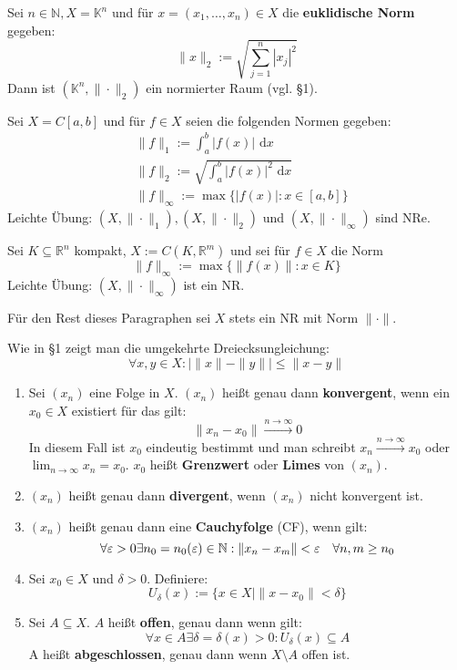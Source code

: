 \documentclass[a4paper,twoside,DIV15,BCOR12mm,chapterprefix=true,headings=twolinechapter]{scrbook}
\begin{document}
\begin{beispiele}
\item Sei $n\in\mathbb{N},X=\mathbb{K}^n$ und für $x=(x_1,\ldots,x_n)\in X$
die \textbf{euklidische Norm} gegeben:
\[\|x\|_2:=\sqrt{\sum_{j=1}^n |x_j|^2}\]
Dann ist $(\mathbb{K}^n,\|\cdot\|_2)$ ein normierter Raum (vgl. §1).
\item Sei $X=C[a,b]$ und für $f\in X$ seien die folgenden Normen gegeben:
\begin{align*}
&\|f\|_1:=\int_a^b|f(x)|\text{ d}x\\
&\|f\|_2:=\sqrt{\int_a^b|f(x)|^2\text{ d}x}\\
&\|f\|_\infty:=\max\{|f(x)|:x\in[a,b]\}
\end{align*}
Leichte Übung: $(X,\|\cdot\|_1),(X,\|\cdot\|_2)$ und $(X,\|\cdot\|_\infty)$
sind NRe.
\item Sei $K\subseteq \mathbb{R}^n$ kompakt, $X:=C(K,\mathbb{R}^m)$ und sei für
$f\in X$ die Norm
\[\|f\|_\infty:=\max\{\|f(x)\|:x\in K\}\]
Leichte Übung: $(X,\|\cdot\|_\infty)$ ist ein NR.
\end{beispiele}

Für den Rest dieses Paragraphen sei $X$ stets ein NR mit Norm $\|\cdot\|$.

\begin{bemerkung}
Wie in §1 zeigt man die umgekehrte Dreiecksungleichung:
\[\forall x,y\in X:|\|x\|-\|y\||\le\|x-y\|\]
\end{bemerkung}

\begin{definition}
\begin{enumerate}
\item Sei $(x_n)$ eine Folge in $X$. $(x_n)$ heißt genau dann \textbf{konvergent},
wenn ein $x_0\in X$ existiert für das gilt:
\[\|x_n-x_0\|\stackrel{n\to\infty}\to 0\]
In diesem Fall ist $x_0$ eindeutig bestimmt und man schreibt $x_n\stackrel{n\to\infty}\to x_0$
oder $\lim_{n\to\infty} x_n=x_0$. $x_0$ heißt \textbf{Grenzwert} oder \textbf{Limes}
von $(x_n)$.
\item $(x_n)$ heißt genau dann \textbf{divergent}, wenn $(x_n)$ nicht konvergent ist.
\item $(x_n)$ heißt genau dann eine \textbf{Cauchyfolge} (CF), wenn gilt:
\[\forall\varepsilon>0 \exists n_0=n_0(\varepsilon)\in\mathbb{N}:\|x_n-x_m\|<\varepsilon\quad \forall n,m\ge n_0\]
\item Sei $x_0\in X$ und $\delta>0$. Definiere:
\[U_\delta(x):=\{x\in X\mid \|x-x_0\|<\delta\}\]
\item Sei $A\subseteq X$. $A$ heißt \textbf{offen}, genau dann wenn gilt:
\[\forall x\in A\exists \delta=\delta(x)>0: U_\delta(x)\subseteq A\]
A heißt \textbf{abgeschlossen}, genau dann wenn $X\setminus A$ offen ist.
\end{enumerate}
\end{definition}
\end{document}
